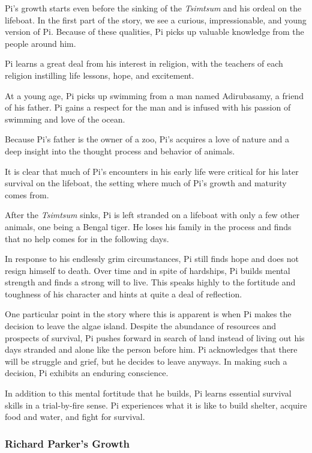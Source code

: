 \documentclass[11pt]{article}
\begin{document}
Pi's growth starts even before the sinking of the \emph{Tsimtsum} and his ordeal on the lifeboat. In the first part of the story, we see a curious, impressionable, and young version of Pi. Because of these qualities, Pi picks up valuable knowledge from the people around him.

Pi learns a great deal from his interest in religion, with the teachers of each religion instilling life lessons, hope, and excitement.

At a young age, Pi picks up swimming from a man named Adirubasamy, a friend of his father. Pi gains a respect for the man and is infused with his passion of swimming and love of the ocean.

Because Pi's father is the owner of a zoo, Pi's acquires a love of nature and a deep insight into the thought process and behavior of animals.

It is clear that much of Pi's encounters in his early life were critical for his later survival on the lifeboat, the setting where much of Pi's growth and maturity comes from.

After the \emph{Tsimtsum} sinks, Pi is left stranded on a lifeboat with only a few other animals, one being a Bengal tiger. He loses his family in the process and finds that no help comes for in the following days.

In response to his endlessly grim circumstances, Pi still finds hope and does not resign himself to death. Over time and in spite of hardships, Pi builds mental strength and finds a strong will to live. This speaks highly to the fortitude and toughness of his character and hints at quite a deal of reflection.

One particular point in the story where this is apparent is when Pi makes the decision to leave the algae island. Despite the abundance of resources and prospects of survival, Pi pushes forward in search of land instead of living out his days stranded and alone like the person before him. Pi acknowledges that there will be struggle and grief, but he decides to leave anyways. In making such a decision, Pi exhibits an enduring conscience.

In addition to this mental fortitude that he builds, Pi learns essential survival skills in a trial-by-fire sense. Pi experiences what it is like to build shelter, acquire food and water, and fight for survival.

\subsubsection{Richard Parker's Growth}
\label{sec:orga183c00}
\end{document}
